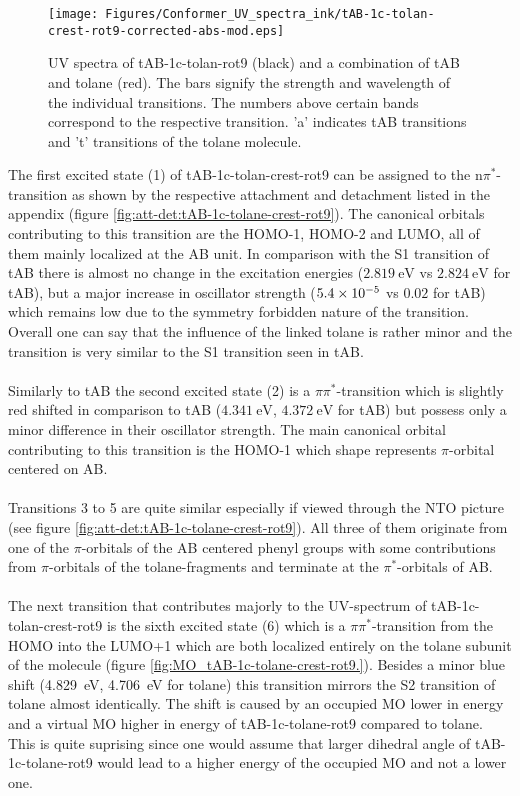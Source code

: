 %
\begin{figure}[H]
    \centering
    \texttt{[image: Figures/Conformer\_UV\_spectra\_ink/tAB-1c-tolan-crest-rot9-corrected-abs-mod.eps]}
    \caption{UV spectra of tAB-1c-tolan-rot9 (black) and a combination of tAB and tolane (red). The bars signify the strength and wavelength of the individual transitions. The numbers above certain bands correspond to the respective transition. 'a' indicates tAB transitions and 't' transitions of the tolane molecule.}
    \label{fig:UV_spec_tAB-1c-tolan}
\end{figure}

The first excited state (1) of tAB-1c-tolan-crest-rot9 can be assigned to the n$\pi^{*}$-transition as shown by the respective attachment and detachment listed in the appendix (figure \ref{fig:att-det:tAB-1c-tolane-crest-rot9}). 
The canonical orbitals contributing to this transition are the HOMO-1, HOMO-2 and LUMO, all of them mainly localized at the AB unit.
In comparison with the S1 transition of tAB there is almost no change in the excitation energies ($\SI{2.819}{\eV}$ vs $\SI{2.824}{\eV}$ for tAB), but a major increase in oscillator strength ($\SI{5.4E-5}{}$ vs $0.02$ for tAB) which remains low due to the symmetry forbidden nature of the transition. Overall one can say that the influence of the linked tolane is rather minor and the transition is very similar to the S1 transition seen in tAB. \\
\\
Similarly to tAB the second excited state (2) is a $\pi \pi^{*}$-transition which is slightly red shifted in comparison to tAB ($\SI{4.341}{\eV}$, $\SI{4.372}{\eV}$ for tAB) but possess only a minor difference in their oscillator strength. The main canonical orbital contributing to this transition is the HOMO-1 which shape represents $\pi$-orbital centered on AB. \\
\\
Transitions 3 to 5 are quite similar especially if viewed through the NTO picture (see figure \ref{fig:att-det:tAB-1c-tolane-crest-rot9}). All three of them originate from one of the $\pi$-orbitals of the AB centered phenyl groups with some contributions from $\pi$-orbitals of the tolane-fragments and terminate at the $\pi^{*}$-orbitals of AB. \\
\\
The next transition that contributes majorly to the UV-spectrum of tAB-1c-tolan-crest-rot9 is the sixth excited state (6) which is a $\pi \pi^{*}$-transition from the HOMO into the LUMO+1 which are both localized entirely on the tolane subunit of the molecule (figure \ref{fig:MO_tAB-1c-tolane-crest-rot9.}). Besides a minor blue shift (\SI{4.829}{\eV},  \SI{4,706}{\eV} for tolane) this transition mirrors the S2 transition of tolane almost identically. The shift is caused by an occupied MO lower in energy and a virtual MO higher in energy of tAB-1c-tolane-rot9 compared to tolane. This is quite suprising since one would assume that larger dihedral angle of tAB-1c-tolane-rot9 would lead to a higher energy of the occupied MO and not a lower one. 
